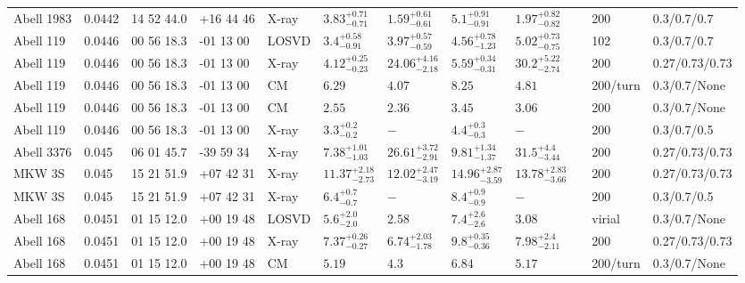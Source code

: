 \begin{landscape}
\begin{center}
{\begin{longtable}{llllllllllll}
Abell 1983 & 0.0442 & 14 52 44.0 & +16 44 46 & X-ray & ${3.83}^{+0.71}_{-0.71}$ & ${1.59}^{+0.61}_{-0.61}$ & ${5.1}^{+0.91}_{-0.91}$ & ${1.97}^{+0.82}_{-0.82}$ & \citet{PO05.1} & 200 & 0.3/0.7/0.7 \\
Abell 119 & 0.0446 & 00 56 18.3 & -01 13 00 & LOSVD & ${3.4}^{+0.58}_{-0.91}$ & ${3.97}^{+0.57}_{-0.59}$ & ${4.56}^{+0.78}_{-1.23}$ & ${5.02}^{+0.73}_{-0.75}$ & \citet{WO10.1} & 102 & 0.3/0.7/0.7 \\
Abell 119 & 0.0446 & 00 56 18.3 & -01 13 00 & X-ray & ${4.12}^{+0.25}_{-0.23}$ & ${24.06}^{+4.16}_{-2.18}$ & ${5.59}^{+0.34}_{-0.31}$ & ${30.2}^{+5.22}_{-2.74}$ & \citet{BA14.1} & 200 & 0.27/0.73/0.73 \\
Abell 119 & 0.0446 & 00 56 18.3 & -01 13 00 & CM & ${6.29}^{}_{}$ & ${4.07}^{}_{}$ & ${8.25}^{}_{}$ & ${4.81}^{}_{}$ & \citet{RI03.1} & 200/turn & 0.3/0.7/None \\
Abell 119 & 0.0446 & 00 56 18.3 & -01 13 00 & CM & ${2.55}^{}_{}$ & ${2.36}^{}_{}$ & ${3.45}^{}_{}$ & ${3.06}^{}_{}$ & \citet{RI06.1} & 200 & 0.3/0.7/None \\
Abell 119 & 0.0446 & 00 56 18.3 & -01 13 00 & X-ray & ${3.3}^{+0.2}_{-0.2}$ & ${-}^{}_{}$ & ${4.4}^{+0.3}_{-0.3}$ & ${-}^{}_{}$ & \citet{XU01.1} & 200 & 0.3/0.7/0.5 \\
Abell 3376 & 0.045 & 06 01 45.7 & -39 59 34 & X-ray & ${7.38}^{+1.01}_{-1.03}$ & ${26.61}^{+3.72}_{-2.91}$ & ${9.81}^{+1.34}_{-1.37}$ & ${31.5}^{+4.4}_{-3.44}$ & \citet{BA14.1} & 200 & 0.27/0.73/0.73 \\
MKW 3S & 0.045 & 15 21 51.9 & +07 42 31 & X-ray & ${11.37}^{+2.18}_{-2.73}$ & ${12.02}^{+2.47}_{-3.19}$ & ${14.96}^{+2.87}_{-3.59}$ & ${13.78}^{+2.83}_{-3.66}$ & \citet{BA14.1} & 200 & 0.27/0.73/0.73 \\
MKW 3S & 0.045 & 15 21 51.9 & +07 42 31 & X-ray & ${6.4}^{+0.7}_{-0.7}$ & ${-}^{}_{}$ & ${8.4}^{+0.9}_{-0.9}$ & ${-}^{}_{}$ & \citet{XU01.1} & 200 & 0.3/0.7/0.5 \\
Abell 168 & 0.0451 & 01 15 12.0 & +00 19 48 & LOSVD & ${5.6}^{+2.0}_{-2.0}$ & ${2.58}^{}_{}$ & ${7.4}^{+2.6}_{-2.6}$ & ${3.08}^{}_{}$ & \citet{AB11.1} & virial & 0.3/0.7/None \\
Abell 168 & 0.0451 & 01 15 12.0 & +00 19 48 & X-ray & ${7.37}^{+0.26}_{-0.27}$ & ${6.74}^{+2.03}_{-1.78}$ & ${9.8}^{+0.35}_{-0.36}$ & ${7.98}^{+2.4}_{-2.11}$ & \citet{BA14.1} & 200 & 0.27/0.73/0.73 \\
Abell 168 & 0.0451 & 01 15 12.0 & +00 19 48 & CM & ${5.19}^{}_{}$ & ${4.3}^{}_{}$ & ${6.84}^{}_{}$ & ${5.17}^{}_{}$ & \citet{RI03.1} & 200/turn & 0.3/0.7/None \\

\end{longtable}}
\end{center}
\end{landscape}
